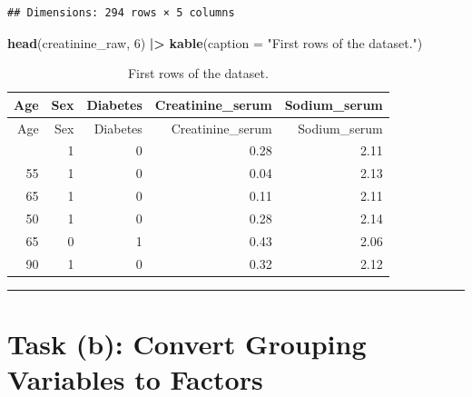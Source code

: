 \documentclass[
  12pt,
]{article}
\newenvironment{Shaded}{\begin{snugshade}}{\end{snugshade}}
\newcommand{\AttributeTok}[1]{\textcolor[rgb]{0.13,0.29,0.53}{#1}}
\newcommand{\DecValTok}[1]{\textcolor[rgb]{0.00,0.00,0.81}{#1}}
\newcommand{\FunctionTok}[1]{\textcolor[rgb]{0.13,0.29,0.53}{\textbf{#1}}}
\newcommand{\NormalTok}[1]{#1}
\newcommand{\SpecialCharTok}[1]{\textcolor[rgb]{0.81,0.36,0.00}{\textbf{#1}}}
\newcommand{\StringTok}[1]{\textcolor[rgb]{0.31,0.60,0.02}{#1}}
\begin{document}
\begin{verbatim}
## Dimensions: 294 rows × 5 columns
\end{verbatim}

\begin{Shaded}
\begin{Highlighting}[]
\FunctionTok{head}\NormalTok{(creatinine\_raw, }\DecValTok{6}\NormalTok{) }\SpecialCharTok{|\textgreater{}} \FunctionTok{kable}\NormalTok{(}\AttributeTok{caption =} \StringTok{"First rows of the dataset."}\NormalTok{)}
\end{Highlighting}
\end{Shaded}

\begin{longtable}[]{@{}rrrrr@{}}
\caption{First rows of the dataset.}\tabularnewline
\toprule\noalign{}
Age & Sex & Diabetes & Creatinine\_serum & Sodium\_serum \\
\midrule\noalign{}
\endfirsthead
\toprule\noalign{}
Age & Sex & Diabetes & Creatinine\_serum & Sodium\_serum \\
\midrule\noalign{}
\endhead
\bottomrule\noalign{}
\endlastfoot
75 & 1 & 0 & 0.28 & 2.11 \\
55 & 1 & 0 & 0.04 & 2.13 \\
65 & 1 & 0 & 0.11 & 2.11 \\
50 & 1 & 0 & 0.28 & 2.14 \\
65 & 0 & 1 & 0.43 & 2.06 \\
90 & 1 & 0 & 0.32 & 2.12 \\
\end{longtable}

\begin{center}\rule{0.5\linewidth}{0.5pt}\end{center}

\hypertarget{task-b-convert-grouping-variables-to-factors}{%
\section{Task (b): Convert Grouping Variables to
Factors}\label{task-b-convert-grouping-variables-to-factors}}
\end{document}
